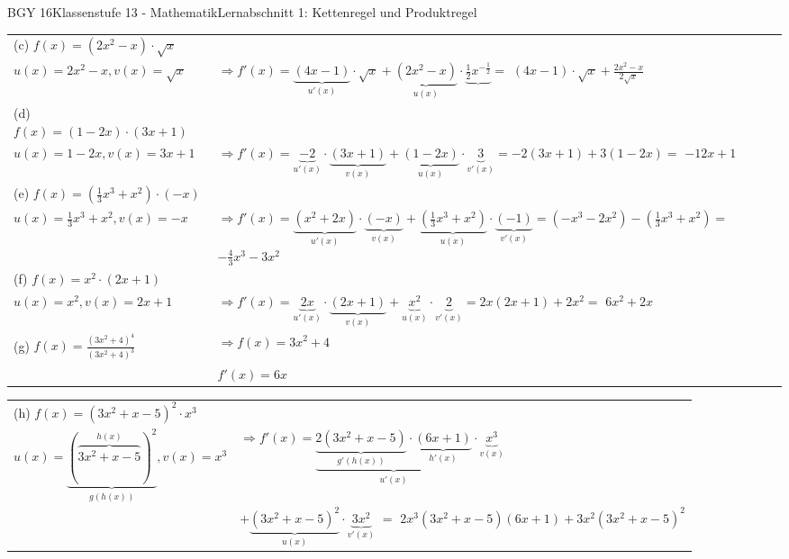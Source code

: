 \documentclass[oneside,openany,headings=optiontotoc,11pt,numbers=noenddot]{scrreprt}
\begin{document}
\begin{worksheet}{BGY 16}{Klassenstufe 13 - Mathematik}{Lernabschnitt 1: Kettenregel und Produktregel}
\begin{framed}
\begin{tabularx}{\textwidth}{lX}
				(c) \(f(x) = (2x^2-x)\cdot\sqrt{x}\)\\
				\(u(x) = 2x^2-x, v(x) = \sqrt{x}\) & \(\Rightarrow f'(x) = \underbrace{(4x-1)}_{u'(x)}\cdot\sqrt{x} + \underbrace{(2x^2-x)}_{u(x)}\cdot\underbrace{\frac{1}{2}x^{-\frac{1}{2}}} =\) \colorbox{green!10}{\((4x-1)\cdot\sqrt{x} + \frac{2x^2-x}{2\sqrt{x}}\)}\\
				(d) \(f(x) = (1-2x)\cdot(3x+1)\)\\
				\(u(x) = 1-2x, v(x) = 3x+1\) & \(\Rightarrow f'(x) = \underbrace{-2}_{u'(x)}\cdot\underbrace{(3x+1)}_{v(x)} + \underbrace{(1-2x)}_{u(x)}\cdot\underbrace{3}_{v'(x)} = -2(3x+1) + 3(1-2x) =\) \colorbox{green!10}{\(-12x+1\)}\\
				(e) \(f(x) = (\frac{1}{3}x^3 +x^2)\cdot{}(-x)\)\\
				\(u(x) = \frac{1}{3}x^3 + x^2, v(x) = -x\) & \(\Rightarrow f'(x) = \underbrace{(x^2 + 2x)}_{u'(x)}\cdot\underbrace{(-x)}_{v(x)} + \underbrace{(\frac{1}{3}x^3+x^2)}_{u(x)}\cdot\underbrace{(-1)}_{v'(x)} = (-x^3-2x^2) - (\frac{1}{3}x^3+x^2) =\) \colorbox{green!10}{\(-\frac{4}{3}x^3-3x^2\)}\\
				(f) \(f(x) = x^2\cdot(2x+1)\)\\
				\(u(x) = x^2, v(x) = 2x+1\) & \(\Rightarrow f'(x) = \underbrace{2x}_{u'(x)}\cdot\underbrace{(2x+1)}_{v(x)} + \underbrace{x^2}_{u(x)}\cdot\underbrace{2}_{v'(x)} = 2x(2x+1)+2x^2 = \) \colorbox{green!10}{\(6x^2+2x\)}\\
				(g) \(f(x) = \frac{(3x^2+4)^4}{(3x^2+4)^3}\) & \(\Rightarrow f(x) = 3x^2+4\)\\
				& \(f'(x) = 6x\)\\
			\end{tabularx}
			\begin{tabularx}{\textwidth}{lX}
				(h) \(f(x) = (3x^2+x-5)^2\cdot{}x^3\)\\
				\(u(x) = \underbrace{(\overbrace{3x^2+x-5}^{h(x)})^2}_{g(h(x))}, v(x) = x^3\) & \(\Rightarrow f'(x) = \underbrace{\underbrace{2(3x^2+x-5)}_{g'(h(x))}\cdot\underbrace{(6x+1)}_{h'(x)}}_{u'(x)}\cdot\underbrace{x^3}_{v(x)}\)\\
				& \(+ \underbrace{(3x^2+x-5)^2}_{u(x)}\cdot\underbrace{3x^2}_{v'(x)}\) \(=\) \colorbox{green!10}{\(2x^3(3x^2+x-5)(6x+1) + 3x^2(3x^2+x-5)^2\)}\\
			\end{tabularx}
		\end{framed}
	\end{worksheet}
\end{document}
